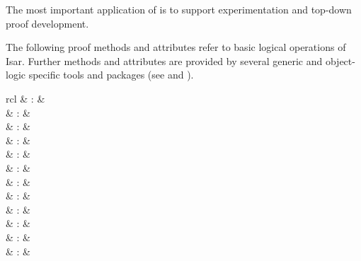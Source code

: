 \begin{isabellebody}
\begin{isamarkuptext}
\begin{description}
  The most important application of \hyperlink{command.sorry}{\mbox{}} is to support
  experimentation and top-down proof development.

  \end{description}%
\end{isamarkuptext}%
\isamarkuptrue%
%
\isamarkuptrue%
%
\begin{isamarkuptext}%
The following proof methods and attributes refer to basic logical
  operations of Isar.  Further methods and attributes are provided by
  several generic and object-logic specific tools and packages (see
   and ).

  \begin{matharray}{rcl}
    \hypertarget{method.-}{\hyperlink{method.-}{\mbox{}}} & : &  \\
    \hypertarget{method.fact}{\hyperlink{method.fact}{\mbox{}}} & : &  \\
    \hypertarget{method.assumption}{\hyperlink{method.assumption}{\mbox{}}} & : &  \\
    \hypertarget{method.this}{\hyperlink{method.this}{\mbox{}}} & : &  \\
    \hypertarget{method.Pure.rule}{\hyperlink{method.Pure.rule}{\mbox{}}} & : &  \\
    \hypertarget{attribute.Pure.intro}{\hyperlink{attribute.Pure.intro}{\mbox{}}} & : &  \\
    \hypertarget{attribute.Pure.elim}{\hyperlink{attribute.Pure.elim}{\mbox{}}} & : &  \\
    \hypertarget{attribute.Pure.dest}{\hyperlink{attribute.Pure.dest}{\mbox{}}} & : &  \\
    \hypertarget{attribute.Pure.rule}{\hyperlink{attribute.Pure.rule}{\mbox{}}} & : &  \\[0.5ex]
    \hypertarget{attribute.OF}{\hyperlink{attribute.OF}{\mbox{}}} & : &  \\
    \hypertarget{attribute.of}{\hyperlink{attribute.of}{\mbox{}}} & : &  \\
    \hypertarget{attribute.where}{\hyperlink{attribute.where}{\mbox{}}} & : &  \\
  \end{matharray}


\end{isamarkuptext}
\end{isabellebody}
